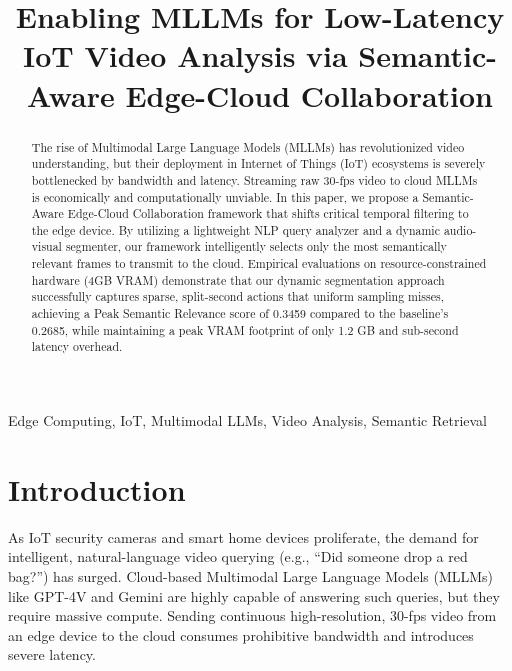 \documentclass[10pt, conference, letterpaper]{IEEEtran}
\begin{document}
\title{Enabling MLLMs for Low-Latency IoT Video Analysis via Semantic-Aware Edge-Cloud Collaboration}

\author{
}

\maketitle

\begin{abstract}
The rise of Multimodal Large Language Models (MLLMs) has revolutionized video understanding, but their deployment in Internet of Things (IoT) ecosystems is severely bottlenecked by bandwidth and latency. Streaming raw 30-fps video to cloud MLLMs is economically and computationally unviable. In this paper, we propose a Semantic-Aware Edge-Cloud Collaboration framework that shifts critical temporal filtering to the edge device. By utilizing a lightweight NLP query analyzer and a dynamic audio-visual segmenter, our framework intelligently selects only the most semantically relevant frames to transmit to the cloud. Empirical evaluations on resource-constrained hardware (4GB VRAM) demonstrate that our dynamic segmentation approach successfully captures sparse, split-second actions that uniform sampling misses, achieving a Peak Semantic Relevance score of 0.3459 compared to the baseline's 0.2685, while maintaining a peak VRAM footprint of only 1.2 GB and sub-second latency overhead.
\end{abstract}

\begin{IEEEkeywords}
Edge Computing, IoT, Multimodal LLMs, Video Analysis, Semantic Retrieval
\end{IEEEkeywords}

\section{Introduction}
As IoT security cameras and smart home devices proliferate, the demand for intelligent, natural-language video querying (e.g., ``Did someone drop a red bag?'') has surged. Cloud-based Multimodal Large Language Models (MLLMs) like GPT-4V and Gemini are highly capable of answering such queries, but they require massive compute. Sending continuous high-resolution, 30-fps video from an edge device to the cloud consumes prohibitive bandwidth and introduces severe latency.
\end{document}
